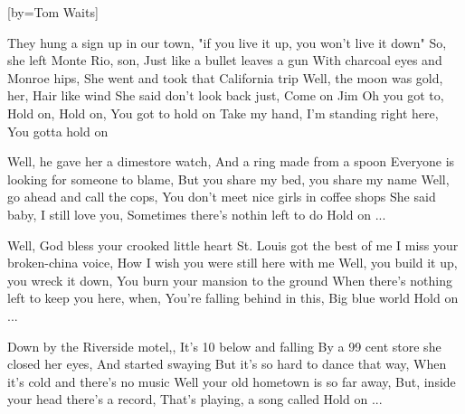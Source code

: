  

[by=Tom Waits]



\beginverse
They hung a sign up in our town, \brk "if you live it up, you won't \brk  live it down"
So, she left Monte Rio, son, \brk  Just like a bullet leaves a gun
With charcoal eyes and Monroe hips, \brk  She went and took that California trip
Well, the moon was gold, her, \brk  Hair like wind
She said don't look back just, \brk  Come on Jim
Oh you got to, \brk  Hold on, Hold on, \brk  You got to hold on
Take my hand, I'm standing right here, \brk  You gotta hold on
\endverse

\beginverse
Well, he gave her a dimestore watch, \brk  And a ring made from a spoon
Everyone is looking for someone to blame, \brk  But you share my bed, you share my name
Well, go ahead and call the cops, \brk  You don't meet nice girls in coffee shops
She said baby, I still love you, \brk  Sometimes there's nothin left to do
Hold on ...
\endverse

\beginverse
Well, God bless your crooked little heart St. Louis got the best of me
I miss your broken-china voice, \brk  How I wish you were still here with me
Well, you build it up, you wreck it down, \brk  You burn your mansion to the ground
When there's nothing left to keep you here, when, \brk  You're falling behind in this, \brk  Big blue world
Hold on ...
\endverse

\beginverse
Down by the Riverside motel,, \brk  It's 10 below and falling
By a 99 cent store she closed her eyes, \brk  And started swaying
But it's so hard to dance that way, \brk  When it's cold and there's no music
Well your old hometown is so far away, \brk  But, inside your head there's a record, \brk  That's playing, a song called
Hold on ...
\endverse


\endsong
